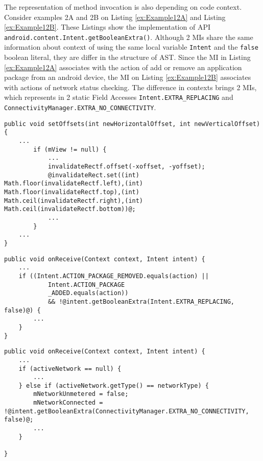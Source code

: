 The representation of method invocation is also depending on code context. Consider examples 2A and 2B on Listing  \ref{ex:Example12A} and Listing \ref{ex:Example12B}. These Listings show the implementation of API \texttt{android.content.Intent.getBooleanExtra()}. Although 2 MIs share the same information about context of using the same local variable \texttt{Intent} and the \texttt{false} boolean literal, they are differ in the structure of AST. Since the MI in Listing \ref{ex:Example12A} associates with the action of add or remove an application package from an android device, the MI on Listing \ref{ex:Example12B} associates with actions of network status checking. The difference in contexts brings 2 MIs, which represents in 2 static Field Accesses \texttt{Intent.EXTRA\_REPLACING} and \texttt{ConnectivityManager.EXTRA\_NO\_CONNECTIVITY}. \\
\noindent
\begin{minipage}[c]{0.3\textwidth}
\begin{lstlisting}[basicstyle=\tiny,caption={Example of invocation of API \texttt{set()} in \cite{id:Example11Complicate}},label={Example11Complicate}]
 public void setOffsets(int newHorizontalOffset, int newVerticalOffset) {
    ...
        if (mView != null) {
            ...
            invalidateRectf.offset(-xoffset, -yoffset);
            @invalidateRect.set((int) Math.floor(invalidateRectf.left),(int) Math.floor(invalidateRectf.top),(int) Math.ceil(invalidateRectf.right),(int) Math.ceil(invalidateRectf.bottom))@;
            ...
        }
    ...
}
\end{lstlisting}
\end{minipage}\hfill
\begin{minipage}[c]{0.3\textwidth}
\begin{lstlisting}[basicstyle=\tiny,caption={Example 2A of API \texttt{getBooleanExtra()} in \cite{id:Example12A}},label={ex:Example12A},]
 public void onReceive(Context context, Intent intent) {
    ...
    if ((Intent.ACTION_PACKAGE_REMOVED.equals(action) ||
            Intent.ACTION_PACKAGE
            _ADDED.equals(action))
            && !@intent.getBooleanExtra(Intent.EXTRA_REPLACING, false)@) {
        ...
    }
}
\end{lstlisting}

\end{minipage}\hfill
\begin{minipage}[c]{.3\textwidth}
\begin{lstlisting}[basicstyle=\tiny,caption={Example 2B of API \texttt{getBooleanExtra()} in \cite{id:Example12B}},label={ex:Example12B}]
public void onReceive(Context context, Intent intent) {
    ...
    if (activeNetwork == null) {
        ...
    } else if (activeNetwork.getType() == networkType) {
        mNetworkUnmetered = false;
        mNetworkConnected = !@intent.getBooleanExtra(ConnectivityManager.EXTRA_NO_CONNECTIVITY, false)@;
        ...
    }
    
}
\end{lstlisting}
\end{minipage}\hfill








